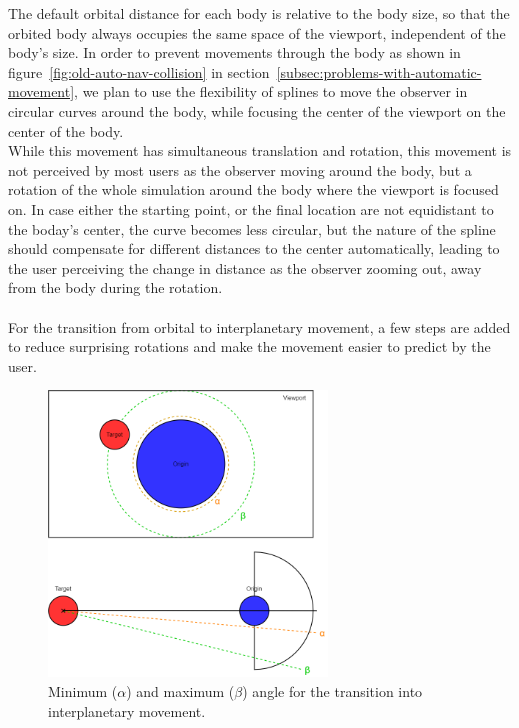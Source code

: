 The default orbital distance for each body is relative to the body size, so that the orbited body always occupies the
same space of the viewport, independent of the body's size.
In order to prevent movements through the body as shown in figure~\ref{fig:old-auto-nav-collision} in
section~\ref{subsec:problems-with-automatic-movement}, we plan to use the flexibility of splines to move the observer
in circular curves around the body, while focusing the center of the viewport on the center of the body.
\\
While this movement has simultaneous translation and rotation, this movement is not perceived by most users as the
observer moving around the body, but a rotation of the whole simulation around the body where the viewport is focused
on.
In case either the starting point, or the final location are not equidistant to the boday's center, the curve becomes
less circular, but the nature of the spline should compensate for different distances to the center automatically,
leading to the user perceiving the change in distance as the observer zooming out, away from the body during the
rotation.
\\
\\
For the transition from orbital to interplanetary movement, a few steps are added to reduce surprising rotations and
make the movement easier to predict by the user.
\begin{figure}[h]
    \centering
    \includegraphics[width=0.66\textwidth]{content/4_3_autoNavigation/img/OrbitTransitionAngles}
    \caption{Minimum ($\alpha$) and maximum ($\beta$) angle for the transition into interplanetary movement.}
    \label{fig:orbital-transition-angles}
\end{figure}
